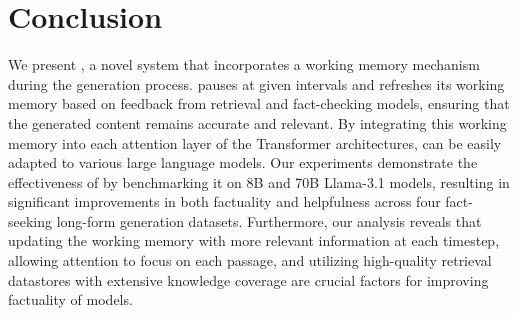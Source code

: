 \section{Conclusion}
\label{sec:conclusion}
We present \model, a novel system that incorporates a working memory mechanism during the generation process. 
\model pauses at given intervals and refreshes its working memory based on feedback from retrieval and fact-checking models, ensuring that the generated content remains accurate and relevant.
By integrating this working memory into each attention layer of the Transformer architectures, \model can be easily adapted to various large language models.
Our experiments demonstrate the effectiveness of \model by benchmarking it on 8B and 70B Llama-3.1 models, resulting in significant improvements in both factuality and helpfulness across four fact-seeking long-form generation datasets. 
Furthermore, our analysis reveals that updating the working memory with more relevant information at each timestep, allowing attention to focus on each passage, and utilizing high-quality retrieval datastores with extensive knowledge coverage are crucial factors for improving factuality of models.